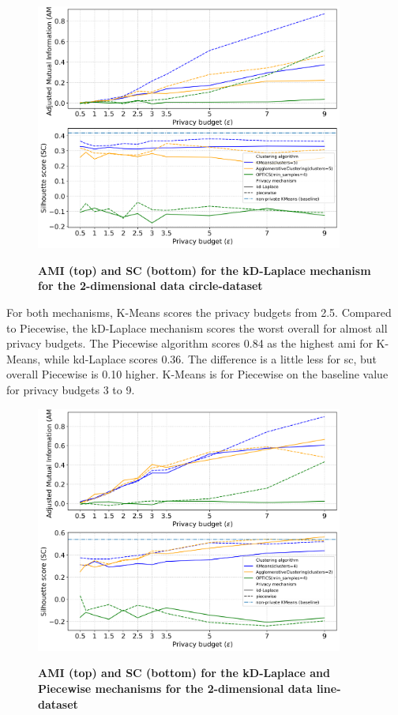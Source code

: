 \begin{figure}[H]
  \centering
  \caption{\textbf{AMI (top) and SC (bottom) for the kD-Laplace mechanism for the 2-dimensional data circle-dataset}}
  \includegraphics[width=0.9\textwidth]{Results/kd-laplace/kd-Laplace/circle-dataset/ami-and-sc_2_dimensions.png}
  \label{fig:validation-circle-dataset_comparison_2d-laplace}
\end{figure}
For both mechanisms, K-Means scores the privacy budgets from 2.5.
Compared to Piecewise, the kD-Laplace mechanism scores the worst overall for almost all privacy budgets.
The Piecewise algorithm scores 0.84 as the highest \gls{ami} for K-Means, while kd-Laplace scores 0.36.
The difference is a little less for \gls{sc}, but overall Piecewise is 0.10 higher.
K-Means is for Piecewise on the baseline value for privacy budgets 3 to 9.
\newpage
\begin{figure}[H]
  \centering
  \caption{\textbf{AMI (top) and SC (bottom) for the kD-Laplace and Piecewise mechanisms for the 2-dimensional data line-dataset}}
  \includegraphics[width=0.9\textwidth]{Results/kd-laplace/kd-Laplace/line-dataset/ami-and-sc_2_dimensions.png}
  \label{fig:validation-line-dataset_comparison_2d-laplace}
\end{figure}
